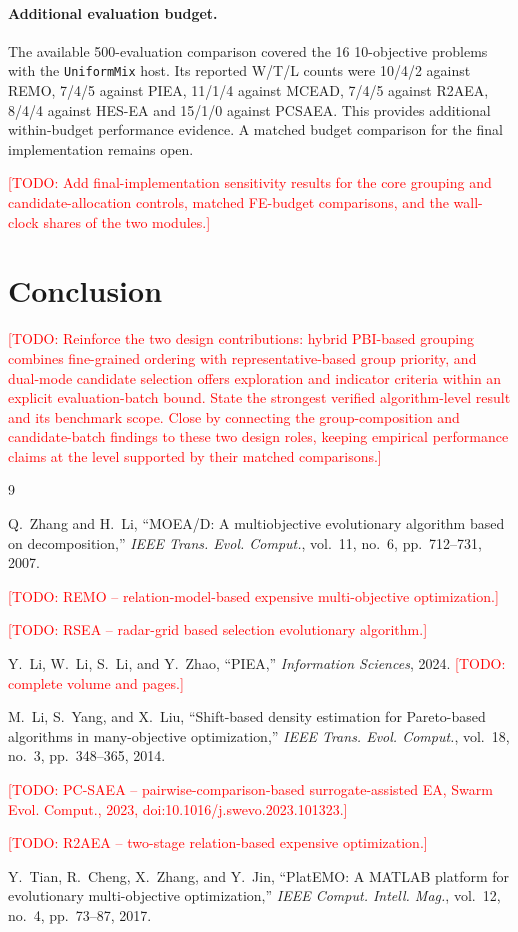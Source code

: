 \documentclass[final,5p,times,twocolumn]{elsarticle}
\newcommand{\TODO}[1]{\textcolor{red}{[TODO: #1]}}
\begin{document}
\paragraph{Additional evaluation budget.}
The available 500-evaluation comparison covered the 16 10-objective
problems with the \texttt{UniformMix} host. Its reported W/T/L counts
were 10/4/2 against REMO, 7/4/5 against PIEA, 11/1/4 against MCEAD,
7/4/5 against R2AEA, 8/4/4 against HES-EA and 15/1/0 against PCSAEA.
This provides additional within-budget performance evidence. A
matched budget comparison for the final implementation remains open.

\TODO{Add final-implementation sensitivity results for the core
grouping and candidate-allocation controls, matched FE-budget comparisons,
and the wall-clock shares of the two modules.}

\clearpage

\section{Conclusion}
\label{sec:conclusion}
\TODO{Reinforce the two design contributions: hybrid PBI-based grouping combines
fine-grained ordering with representative-based group priority, and dual-mode
candidate selection offers exploration and indicator criteria within an
explicit evaluation-batch bound. State the strongest verified algorithm-level
result and its benchmark scope. Close by connecting the group-composition and
candidate-batch findings to these two design roles, keeping empirical performance
claims at the level supported by their matched comparisons.}

\begin{thebibliography}{9}

Q.~Zhang and H.~Li,
``MOEA/D: A multiobjective evolutionary algorithm based on decomposition,''
\emph{IEEE Trans. Evol. Comput.}, vol.~11, no.~6, pp.~712--731, 2007.

\TODO{REMO -- relation-model-based expensive multi-objective optimization.}

\TODO{RSEA -- radar-grid based selection evolutionary algorithm.}

Y.~Li, W.~Li, S.~Li, and Y.~Zhao,
``PIEA,'' \emph{Information Sciences}, 2024.
\TODO{complete volume and pages.}

M.~Li, S.~Yang, and X.~Liu,
``Shift-based density estimation for Pareto-based algorithms in
many-objective optimization,''
\emph{IEEE Trans. Evol. Comput.}, vol.~18, no.~3, pp.~348--365, 2014.

\TODO{PC-SAEA -- pairwise-comparison-based surrogate-assisted EA,
Swarm Evol. Comput., 2023, doi:10.1016/j.swevo.2023.101323.}

\TODO{R2AEA -- two-stage relation-based expensive optimization.}

Y.~Tian, R.~Cheng, X.~Zhang, and Y.~Jin,
``PlatEMO: A MATLAB platform for evolutionary multi-objective optimization,''
\emph{IEEE Comput. Intell. Mag.}, vol.~12, no.~4, pp.~73--87, 2017.

\end{thebibliography}
\end{document}
